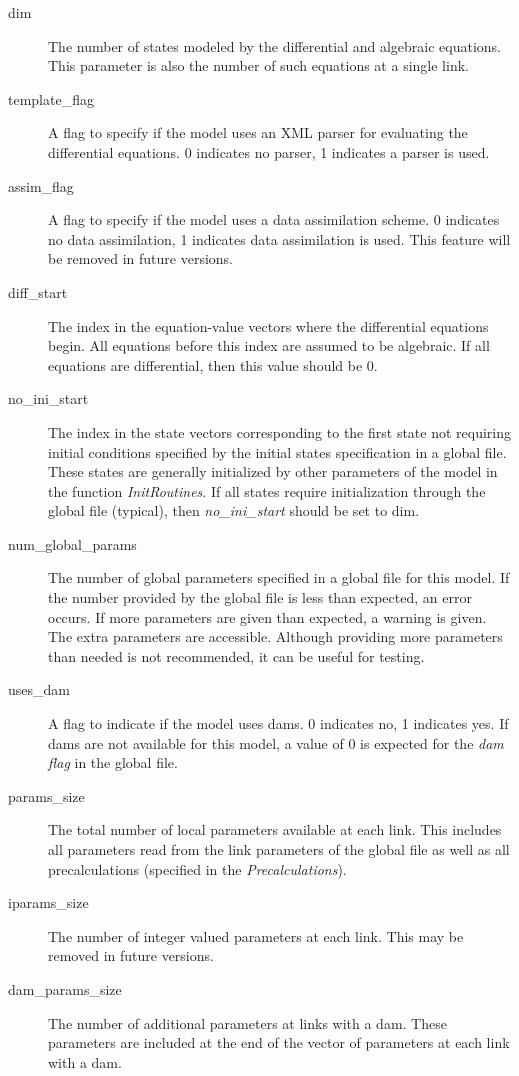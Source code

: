 \documentclass[12pt]{article}
\begin{document}
\begin{description}
 \item[dim] The number of states modeled by the differential and algebraic equations. This parameter is also the number of such equations at a single link. 
 \item[template\_flag] A flag to specify if the model uses an XML parser for evaluating the differential equations. 0 indicates no parser, 1 indicates a parser is used.
 \item[assim\_flag] A flag to specify if the model uses a data assimilation scheme. 0 indicates no data assimilation, 1 indicates data assimilation is used. This feature will be removed in future versions.
 \item[diff\_start] The index in the equation-value vectors where the differential equations begin. All equations before this index are assumed to be algebraic. If all equations are differential, then this value should be 0.
 \item[no\_ini\_start] The index in the state vectors corresponding to the first state not requiring initial conditions specified by the initial states specification in a global file. These states are generally initialized by other parameters of the model in the function \textit{InitRoutines}. If all states require initialization through the global file (typical), then \emph{no\_ini\_start} should be set to dim.
 \item[num\_global\_params] The number of global parameters specified in a global file for this model. If the number provided by the global file is less than expected, an error occurs. If more parameters are given than expected, a warning is given. The extra parameters are accessible. Although providing more parameters than needed is not recommended, it can be useful for testing.
 \item[uses\_dam] A flag to indicate if the model uses dams. 0 indicates no, 1 indicates yes. If dams are not available for this model, a value of 0 is expected for the \emph{dam flag} in the global file.
 \item[params\_size] The total number of local parameters available at each link. This includes all parameters read from the link parameters of the global file as well as all precalculations (specified in the \textit{Precalculations}).
 \item[iparams\_size] The number of integer valued parameters at each link. This may be removed in future versions.
 \item[dam\_params\_size] The number of additional parameters at links with a dam. These parameters are included at the end of the vector of parameters at each link with a dam.

\end{description}
\end{document}
